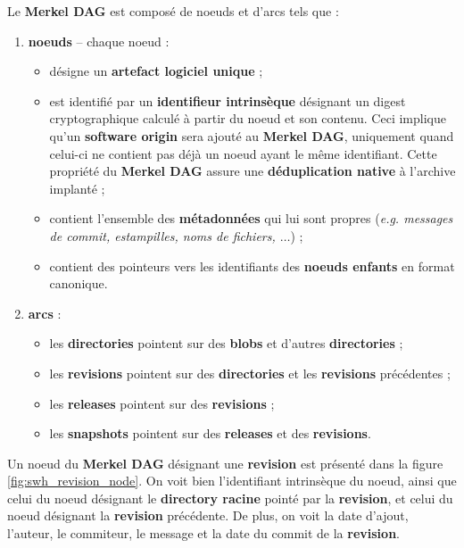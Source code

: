 \documentclass[12pt,a4paper]{report}
\theoremstyle{definition}
\begin{document}
Le \textbf{Merkel DAG} est composé de noeuds et d'arcs tels que :
\begin{enumerate}
	\item \textbf{noeuds} -- chaque noeud :
	\begin{itemize}
		\item désigne un \textbf{artefact logiciel unique} ;
		\item est identifié par un \textbf{identifieur intrinsèque} désignant un digest cryptographique calculé à partir du noeud et son contenu. Ceci implique qu'un \textbf{software origin} sera ajouté au \textbf{Merkel DAG}, uniquement quand celui-ci ne contient pas déjà un noeud ayant le même identifiant. Cette propriété du \textbf{Merkel DAG} assure une \textbf{déduplication native} à l'archive implanté ;
		\item contient l'ensemble des \textbf{métadonnées} qui lui sont propres (\textit{e.g. messages de commit, estampilles, noms de fichiers, $\dots$}) ;
		\item contient des pointeurs vers les identifiants des \textbf{noeuds enfants} en format canonique.
	\end{itemize}
	\item \textbf{arcs} :
	\begin{itemize}
		\item les \textbf{directories} pointent sur des \textbf{blobs} et d'autres \textbf{directories} ;
		\item les \textbf{revisions} pointent sur des \textbf{directories} et les \textbf{revisions} précédentes ;
		\item les \textbf{releases} pointent sur des \textbf{revisions} ;
		\item les \textbf{snapshots} pointent sur des \textbf{releases} et des \textbf{revisions}.
	\end{itemize}
\end{enumerate}

Un noeud du \textbf{Merkel DAG} désignant une \textbf{revision} est présenté dans la figure \ref{fig:swh_revision_node}. On voit bien l'identifiant intrinsèque du noeud, ainsi que celui du noeud désignant le \textbf{directory racine} pointé par la \textbf{revision}, et celui du noeud désignant la \textbf{revision} précédente. De plus, on voit la date d'ajout, l'auteur, le commiteur, le message et la date du commit de la \textbf{revision}.
\end{document}

